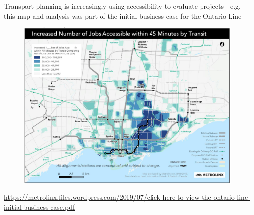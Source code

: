 \documentclass[aspectratio=169]{beamer}
\begin{document}
\begin{frame}
	
	Transport planning is increasingly using accessibility to evaluate projects - e.g. this map and analysis was part of the initial business case for the Ontario Line
	
	\begin{figure}
		\centering
		\includegraphics[width=0.7\linewidth]{images/OL_access_improvements.png}
	\end{figure}
	
	\tiny\url{https://metrolinx.files.wordpress.com/2019/07/click-here-to-view-the-ontario-line-initial-business-case.pdf}
	
	

	
\end{frame}
\end{document}
